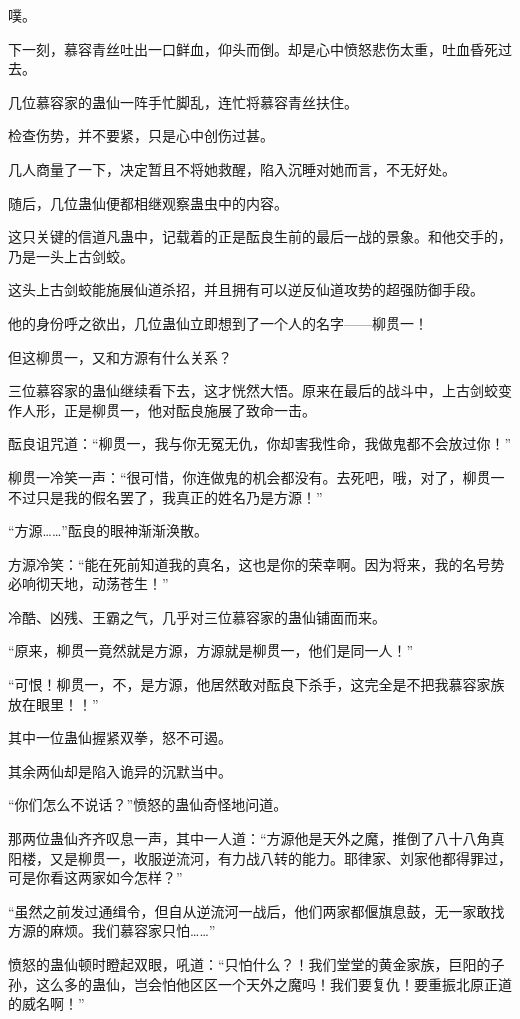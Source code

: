 \begin{this_body}
噗。

下一刻，慕容青丝吐出一口鲜血，仰头而倒。却是心中愤怒悲伤太重，吐血昏死过去。

几位慕容家的蛊仙一阵手忙脚乱，连忙将慕容青丝扶住。

检查伤势，并不要紧，只是心中创伤过甚。

几人商量了一下，决定暂且不将她救醒，陷入沉睡对她而言，不无好处。

随后，几位蛊仙便都相继观察蛊虫中的内容。

这只关键的信道凡蛊中，记载着的正是酝良生前的最后一战的景象。和他交手的，乃是一头上古剑蛟。

这头上古剑蛟能施展仙道杀招，并且拥有可以逆反仙道攻势的超强防御手段。

他的身份呼之欲出，几位蛊仙立即想到了一个人的名字——柳贯一！

但这柳贯一，又和方源有什么关系？

三位慕容家的蛊仙继续看下去，这才恍然大悟。原来在最后的战斗中，上古剑蛟变作人形，正是柳贯一，他对酝良施展了致命一击。

酝良诅咒道：“柳贯一，我与你无冤无仇，你却害我性命，我做鬼都不会放过你！”

柳贯一冷笑一声：“很可惜，你连做鬼的机会都没有。去死吧，哦，对了，柳贯一不过只是我的假名罢了，我真正的姓名乃是方源！”

“方源……”酝良的眼神渐渐涣散。

方源冷笑：“能在死前知道我的真名，这也是你的荣幸啊。因为将来，我的名号势必响彻天地，动荡苍生！”

冷酷、凶残、王霸之气，几乎对三位慕容家的蛊仙铺面而来。

“原来，柳贯一竟然就是方源，方源就是柳贯一，他们是同一人！”

“可恨！柳贯一，不，是方源，他居然敢对酝良下杀手，这完全是不把我慕容家族放在眼里！！”

其中一位蛊仙握紧双拳，怒不可遏。

其余两仙却是陷入诡异的沉默当中。

“你们怎么不说话？”愤怒的蛊仙奇怪地问道。

那两位蛊仙齐齐叹息一声，其中一人道：“方源他是天外之魔，推倒了八十八角真阳楼，又是柳贯一，收服逆流河，有力战八转的能力。耶律家、刘家他都得罪过，可是你看这两家如今怎样？”

“虽然之前发过通缉令，但自从逆流河一战后，他们两家都偃旗息鼓，无一家敢找方源的麻烦。我们慕容家只怕……”

愤怒的蛊仙顿时瞪起双眼，吼道：“只怕什么？！我们堂堂的黄金家族，巨阳的子孙，这么多的蛊仙，岂会怕他区区一个天外之魔吗！我们要复仇！要重振北原正道的威名啊！”


\end{this_body}
